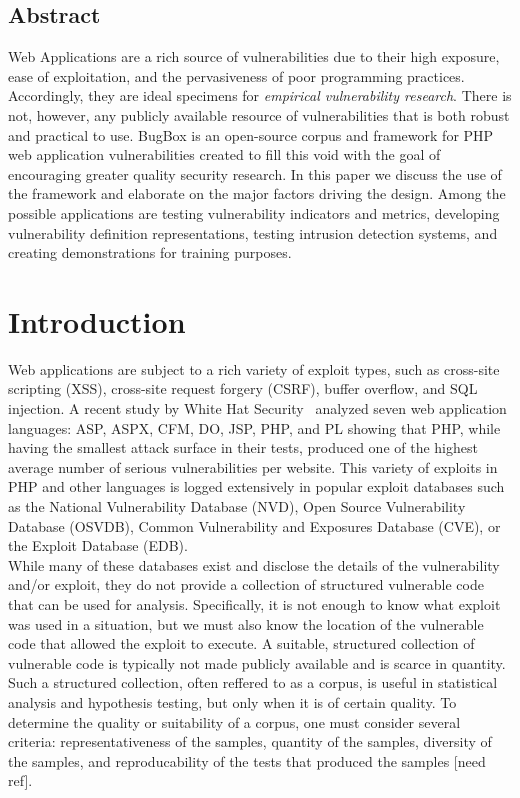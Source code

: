 \documentclass[letterpaper,twocolumn,10pt]{article}
\begin{document}


\subsection*{Abstract}
Web Applications are a rich source of vulnerabilities due to their high exposure, ease of exploitation, and the pervasiveness of poor programming practices. Accordingly, they are ideal specimens for \emph{empirical vulnerability research}. There is not, however, any publicly available resource of vulnerabilities that is both robust and practical to use. BugBox is an open-source corpus and framework for PHP web application vulnerabilities created to fill this void with the goal of encouraging greater quality security research. In this paper we discuss the use of the framework and elaborate on the major factors driving the design. Among the possible applications are testing vulnerability indicators and metrics, developing vulnerability definition representations, testing intrusion detection systems, and creating demonstrations for training purposes.  

\section{Introduction}
Web applications are subject to a rich variety of exploit types, such as cross-site scripting (XSS), cross-site request forgery (CSRF), buffer overflow, and SQL injection.  A recent study by White Hat Security~\cite{WhiteHat:2010:Online} analyzed seven web application languages: ASP, ASPX, CFM, DO, JSP, PHP, and PL showing that PHP, while having the smallest attack surface in their tests, produced one of the highest average number of serious vulnerabilities per website.  This variety of exploits in PHP and other languages is logged extensively in popular exploit databases such as the National Vulnerability Database (NVD), Open Source Vulnerability Database (OSVDB), Common Vulnerability and Exposures Database (CVE), or the Exploit Database (EDB).\\

While many of these databases exist and disclose the details of the vulnerability and/or exploit, they do not provide a collection of structured vulnerable code that can be used for analysis.  Specifically, it is not enough to know what exploit was used in a situation, but we must also know the location of the vulnerable code that allowed the exploit to execute.  A suitable, structured collection of vulnerable code is typically not made publicly available and is scarce in quantity.  Such a structured collection, often reffered to as a corpus, is useful in statistical analysis and hypothesis testing, but only when it is of certain quality.  To determine the quality or suitability of a corpus, one must consider several criteria: representativeness of the samples, quantity of the samples, diversity of the samples, and reproducability of the tests that produced the samples [need ref].\\
\end{document}
